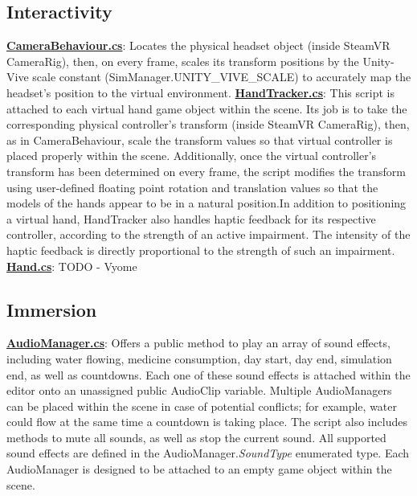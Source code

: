 \documentclass{article}
\begin{document}
\subsection*{Interactivity} %
\href{https://bit.ly/2JH9ws0}{\textbf{CameraBehaviour.cs}}: Locates the physical headset object (inside SteamVR CameraRig), then, on every frame, scales its transform positions by the Unity-Vive scale constant (SimManager.UNITY\_VIVE\_SCALE) to accurately map the headset's position to the virtual environment. \newline \newline
\href{https://bit.ly/2U3xT7n}{\textbf{HandTracker.cs}}: This script is attached to each virtual hand game object within the scene. Its job is to take the corresponding physical controller's transform (inside SteamVR CameraRig), then, as in CameraBehaviour, scale the transform values so that virtual controller is placed properly within the scene. Additionally, once the virtual controller's transform has been determined on every frame, the script modifies the transform using user-defined floating point rotation and translation values so that the models of the hands appear to be in a natural position.\newline In addition to positioning a virtual hand, HandTracker also handles haptic feedback for its respective controller, according to the strength of an active impairment. The intensity of the haptic feedback is directly proportional to the strength of such an impairment. \newline \newline
\href{}{\textbf{Hand.cs}}: TODO - Vyome


\subsection*{Immersion} %
\href{https://bit.ly/2HHzDwj}{\textbf{AudioManager.cs}}: Offers a public method to play an array of sound effects, including water flowing, medicine consumption, day start, day end, simulation end, as well as countdowns. Each one of these sound effects is attached within the editor onto an unassigned public AudioClip variable. Multiple AudioManagers can be placed within the scene in case of potential conflicts; for example, water could flow at the same time a countdown is taking place. The script also includes methods to mute all sounds, as well as stop the current sound. All supported sound effects are defined in the AudioManager.\textit{SoundType} enumerated type. Each AudioManager is designed to be attached to an empty game object within the scene.
\end{document}
